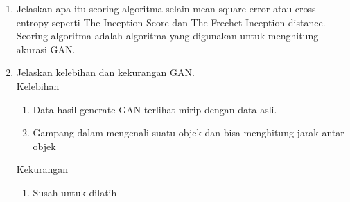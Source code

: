 \begin{enumerate}
    \item Jelaskan apa itu scoring algoritma selain mean square error atau cross entropy seperti The Inception Score dan The Frechet Inception distance.\\
    Scoring algoritma adalah algoritma yang digunakan untuk menghitung akurasi GAN.
    
    \item Jelaskan kelebihan dan kekurangan GAN.\\
    Kelebihan
    \begin{enumerate}
    	\item Data hasil generate GAN terlihat mirip dengan data asli.
		\item Gampang dalam mengenali suatu objek dan bisa menghitung jarak antar objek
    \end{enumerate}
    Kekurangan
    \begin{enumerate}
    	\item Susah untuk dilatih
    \end{enumerate}

\end{enumerate}

